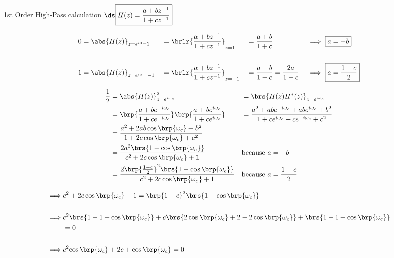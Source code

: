 1st Order High-Pass calculation
$\ds\boxed{ H(z) = \frac{a + bz^{-1}}
                        {1 + cz^{-1}}
          }$

\begin{align*}
  0 &= {\abs{H(z)}}_{z=e^{i0}=1}    
    &&=\brlr{\frac{a + bz^{-1}}{1 + cz^{-1}}}_{z=1} 
    &&=\frac{a + b}{1 + c}                   
    && \implies \boxed{a=-b}
  \\\\
  1 &= \abs{H(z)}_{z=e^{i\pi}=-1} 
   &&= \brlr{\frac{a + bz^{-1}}{1 + cz^{-1}}}_{z=-1} 
   &&= \frac{a - b}{1 - c} = \frac{2a}{1-c}                   
   &&  \implies \boxed{a=\frac{1-c}{2}}
\end{align*}


%
\begin{align*}
  \frac{1}{2}
    &= \abs{H(z)}^2_{z=e^{i\omega_c}}
   &&= \brs{H(z)H^\ast(z)}_{z=e^{i\omega_c}}
  \\&= \brp{\frac{a + be^{-i\omega_c}}{1 + ce^{-i\omega_c}}}
       \brp{\frac{a + be^{i\omega_c}}{1 + ce^{i\omega_c}}}
   &&= \frac{a^2 + abe^{-i\omega_c} + abe^{i\omega_c} + b^2}
            {1   +  ce^{i\omega_c} +  ce^{-i\omega_c} + c^2}
  \\&= \frac{a^2 + 2ab\cos\brp{\omega_c} + b^2}
            {1   + 2 c\cos\brp{\omega_c} + c^2}
  \\&= \frac{2a^2\brs{1 -  \cos\brp{\omega_c}}}
            {c^2 + 2 c\cos\brp{\omega_c} + 1}
    && \text{because $a=-b$}
  \\&= \frac{2\brp{\frac{1-c}{2}}^2\brs{1 -  \cos\brp{\omega_c}}}
            {c^2 + 2 c\cos\brp{\omega_c} + 1}
    && \text{because $a=\frac{1-c}{2}$}
\end{align*}


{\begin{align*}
    \implies &c^2 + 2 c\cos\brp{\omega_c} + 1 
             = \brp{1-c}^2\brs{1 -  \cos\brp{\omega_c}}
  \\\\\implies & c^2\brs{1-1+\cos\brp{\omega_c}} 
             + c  \brs{2\cos\brp{\omega_c}+2-2\cos\brp{\omega_c}}
             +    \brs{1-1+\cos\brp{\omega_c}}
             \\&= 0
  \\\\\implies & c^2{\cos\brp{\omega_c}} 
             + 2c 
             +    \cos\brp{\omega_c}
             = 0
\end{align*}}



